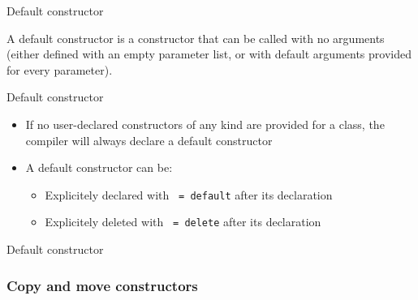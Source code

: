 \begin{frame}{Default constructor}{}
  \begin{definition}
    A default constructor is a constructor that can be called with no arguments (either defined with an empty parameter list, or with default arguments provided for every parameter).
  \end{definition}

  \begin{block}{Default constructor}
    \begin{itemize}
    \item
      If no user-declared constructors of any kind are provided for a class, the compiler will always declare a default constructor
    \item
      A default constructor can be:
      \begin{itemize}
      \item
        Explicitely declared with \lstinline! = default! after its declaration
      \item
        Explicitely deleted with \lstinline! = delete! after its declaration
      \end{itemize}
    \end{itemize}
  \end{block}
\end{frame}

\begin{frame}{Default constructor}{}
  \begin{example}
  \end{example}
\end{frame}


\subsubsection{Copy and move constructors}

